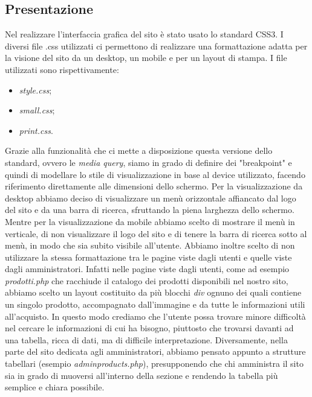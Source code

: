 \subsection{Presentazione}

Nel realizzare l'interfaccia grafica del sito è stato usato lo standard CSS3.\newline
I diversi file .css utilizzati ci permettono di realizzare una formattazione adatta per la visione del sito da un desktop, un mobile e per un layout di stampa.\newline
I file utilizzati sono rispettivamente:
\begin{itemize}
\item\textit{style.css};
\item\textit{small.css};
\item\textit{print.css}.
\end{itemize}
Grazie alla funzionalità che ci mette a disposizione questa versione dello standard, ovvero le \textit{media query}, siamo in grado di definire dei "breakpoint" e quindi di modellare lo stile di visualizzazione in base al device utilizzato, facendo riferimento direttamente alle dimensioni dello schermo.\newline
Per la visualizzazione da desktop abbiamo deciso di visualizzare un menù orizzontale affiancato dal logo del sito e da una barra di ricerca, sfruttando la piena larghezza dello schermo.\newline 
Mentre per la visualizzazione da mobile abbiamo scelto di mostrare il menù in verticale, di non visualizzare il logo del sito e di tenere la barra di ricerca sotto al menù, in modo che sia subito visibile all'utente.\newline
\newline
Abbiamo inoltre scelto di non utilizzare la stessa formattazione tra le pagine viste dagli utenti e quelle viste dagli amministratori. Infatti nelle pagine viste dagli utenti, come ad esempio \textit{prodotti.php} che racchiude il catalogo dei prodotti disponibili nel nostro sito, abbiamo scelto un layout costituito da più blocchi \textit{div} ognuno dei quali contiene un singolo prodotto, accompagnato dall'immagine e da tutte le informazioni utili all'acquisto.\newline
In questo modo crediamo che l'utente possa trovare minore difficoltà nel cercare le informazioni di cui ha bisogno, piuttosto che trovarsi davanti ad una tabella, ricca di dati, ma di difficile interpretazione.\newline
Diversamente, nella parte del sito dedicata agli amministratori, abbiamo pensato appunto a strutture tabellari (esempio \textit{adminproducts.php}), presupponendo che chi amministra il sito sia in grado di muoversi all'interno della sezione e rendendo la tabella più semplice e chiara possibile.